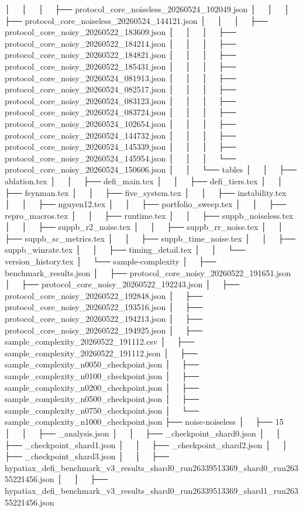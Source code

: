 │   │   │   ├── protocol_core_noiseless_20260524_102049.json
│   │   │   ├── protocol_core_noiseless_20260524_144121.json
│   │   │   ├── protocol_core_noisy_20260522_183609.json
│   │   │   ├── protocol_core_noisy_20260522_184214.json
│   │   │   ├── protocol_core_noisy_20260522_184821.json
│   │   │   ├── protocol_core_noisy_20260522_185431.json
│   │   │   ├── protocol_core_noisy_20260524_081913.json
│   │   │   ├── protocol_core_noisy_20260524_082517.json
│   │   │   ├── protocol_core_noisy_20260524_083123.json
│   │   │   ├── protocol_core_noisy_20260524_083724.json
│   │   │   ├── protocol_core_noisy_20260524_102654.json
│   │   │   ├── protocol_core_noisy_20260524_144732.json
│   │   │   ├── protocol_core_noisy_20260524_145339.json
│   │   │   ├── protocol_core_noisy_20260524_145954.json
│   │   │   └── protocol_core_noisy_20260524_150606.json
│   │   └── tables
│   │       ├── ablation.tex
│   │       ├── defi_main.tex
│   │       ├── defi_tiers.tex
│   │       ├── feynman.tex
│   │       ├── five_system.tex
│   │       ├── instability.tex
│   │       ├── nguyen12.tex
│   │       ├── portfolio_sweep.tex
│   │       ├── repro_macros.tex
│   │       ├── runtime.tex
│   │       ├── suppb_noiseless.tex
│   │       ├── suppb_r2_noise.tex
│   │       ├── suppb_rr_noise.tex
│   │       ├── suppb_sc_metrics.tex
│   │       ├── suppb_time_noise.tex
│   │       ├── suppb_winrate.tex
│   │       ├── timing_detail.tex
│   │       └── version_history.tex
│   └── sample-complexity
│       ├── benchmark_results.json
│       ├── protocol_core_noisy_20260522_191651.json
│       ├── protocol_core_noisy_20260522_192243.json
│       ├── protocol_core_noisy_20260522_192848.json
│       ├── protocol_core_noisy_20260522_193516.json
│       ├── protocol_core_noisy_20260522_194213.json
│       ├── protocol_core_noisy_20260522_194925.json
│       ├── sample_complexity_20260522_191112.csv
│       ├── sample_complexity_20260522_191112.json
│       ├── sample_complexity_n0050_checkpoint.json
│       ├── sample_complexity_n0100_checkpoint.json
│       ├── sample_complexity_n0200_checkpoint.json
│       ├── sample_complexity_n0500_checkpoint.json
│       ├── sample_complexity_n0750_checkpoint.json
│       └── sample_complexity_n1000_checkpoint.json
├── noise-noiseless
│   ├── 15
│   │   ├── _analysis.json
│   │   ├── _checkpoint_shard0.json
│   │   ├── _checkpoint_shard1.json
│   │   ├── _checkpoint_shard2.json
│   │   ├── _checkpoint_shard3.json
│   │   ├── hypatiax_defi_benchmark_v3_results_shard0_run26339513369_shard0_run26355221456.json
│   │   ├── hypatiax_defi_benchmark_v3_results_shard0_run26339513369_shard1_run26355221456.json
